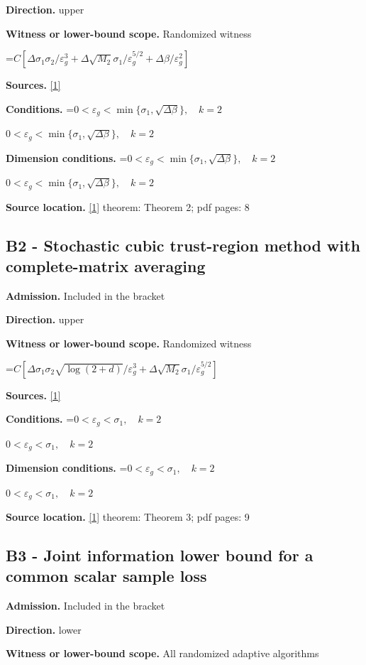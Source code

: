 \documentclass[10pt,a4paper]{article}
\newcommand{\AtlasMath}[1]{\par\begingroup\centering\setbox0=\hbox{$\displaystyle #1$}\ifdim\wd0>1.4\linewidth\typeout{ATLAS WIDE FORMULA: \the\wd0}\fi\ifdim\wd0>\linewidth\resizebox{\linewidth}{!}{\box0}\else\box0\fi\par\endgroup}
\newcommand{\AtlasInlineMath}[1]{\begingroup\setbox0=\hbox{$#1$}\ifdim\wd0>.4\linewidth\endgroup\AtlasMath{#1}\else\endgroup$#1$\fi}
\begin{document}
\textbf{Direction.} upper

\textbf{Witness or lower-bound scope.} Randomized witness

\AtlasMath{C[\Delta\sigma_1\sigma_2/\varepsilon_g^3+\Delta\sqrt{M_2}\sigma_1/\varepsilon_g^{5/2}+\Delta\beta/\varepsilon_g^2]}
\textbf{Sources.} \href{https://proceedings.mlr.press/v125/arjevani20a/arjevani20a.pdf}{[1]}

\textbf{Conditions.} \AtlasInlineMath{0<\varepsilon_g<\min\{\sigma_1,\sqrt{\Delta\beta}\},\quad k=2}

\textbf{Dimension conditions.} \AtlasInlineMath{0<\varepsilon_g<\min\{\sigma_1,\sqrt{\Delta\beta}\},\quad k=2}

\textbf{Source location.} \href{https://proceedings.mlr.press/v125/arjevani20a/arjevani20a.pdf}{[1]} theorem: Theorem 2; pdf pages: 8

\subsection{B2 - Stochastic cubic trust-region method with complete-matrix averaging}
\textbf{Admission.} Included in the bracket

\textbf{Direction.} upper

\textbf{Witness or lower-bound scope.} Randomized witness

\AtlasMath{C[\Delta\sigma_1\sigma_2\sqrt{\log(2+d)}/\varepsilon_g^3+\Delta\sqrt{M_2}\sigma_1/\varepsilon_g^{5/2}]}
\textbf{Sources.} \href{https://proceedings.mlr.press/v125/arjevani20a/arjevani20a.pdf}{[1]}

\textbf{Conditions.} \AtlasInlineMath{0<\varepsilon_g<\sigma_1,\quad k=2}

\textbf{Dimension conditions.} \AtlasInlineMath{0<\varepsilon_g<\sigma_1,\quad k=2}

\textbf{Source location.} \href{https://proceedings.mlr.press/v125/arjevani20a/arjevani20a.pdf}{[1]} theorem: Theorem 3; pdf pages: 9

\subsection{B3 - Joint information lower bound for a common scalar sample loss}
\textbf{Admission.} Included in the bracket

\textbf{Direction.} lower

\textbf{Witness or lower-bound scope.} All randomized adaptive algorithms
\end{document}
